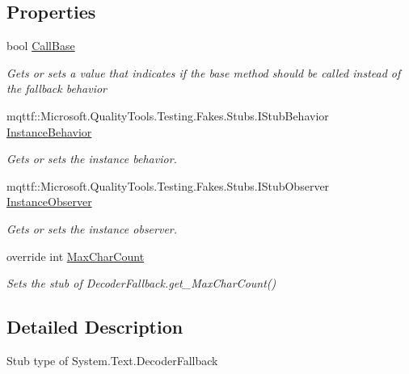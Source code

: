 \subsection*{Properties}
\begin{DoxyCompactItemize}
\item 
bool \hyperlink{class_system_1_1_text_1_1_fakes_1_1_stub_decoder_fallback_a7c891a66175d4666c860d16c1f0f7ff9}{Call\-Base}
\begin{DoxyCompactList}\small\item\em Gets or sets a value that indicates if the base method should be called instead of the fallback behavior\end{DoxyCompactList}\item 
mqttf\-::\-Microsoft.\-Quality\-Tools.\-Testing.\-Fakes.\-Stubs.\-I\-Stub\-Behavior \hyperlink{class_system_1_1_text_1_1_fakes_1_1_stub_decoder_fallback_acb3bc58baf142347ce66c9988562b6aa}{Instance\-Behavior}
\begin{DoxyCompactList}\small\item\em Gets or sets the instance behavior.\end{DoxyCompactList}\item 
mqttf\-::\-Microsoft.\-Quality\-Tools.\-Testing.\-Fakes.\-Stubs.\-I\-Stub\-Observer \hyperlink{class_system_1_1_text_1_1_fakes_1_1_stub_decoder_fallback_a26ba3ab137e9506f5d20d4a1ddf3a224}{Instance\-Observer}
\begin{DoxyCompactList}\small\item\em Gets or sets the instance observer.\end{DoxyCompactList}\item 
override int \hyperlink{class_system_1_1_text_1_1_fakes_1_1_stub_decoder_fallback_ae76266678bcc45a0563f6c7629e629ae}{Max\-Char\-Count}
\begin{DoxyCompactList}\small\item\em Sets the stub of Decoder\-Fallback.\-get\-\_\-\-Max\-Char\-Count()\end{DoxyCompactList}\end{DoxyCompactItemize}


\subsection{Detailed Description}
Stub type of System.\-Text.\-Decoder\-Fallback



